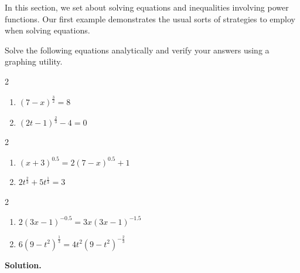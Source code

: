 \documentclass{ximera}
\begin{document}
	\author{Stitz-Zeager}




\setcounter{footnote}{0}

\label{PowerEqIneq}

In this section, we set about solving equations and inequalities involving power functions.  Our first example demonstrates the usual sorts of strategies to employ when solving equations.

\begin{example} \label{powerequationex}  Solve the following equations analytically and verify your answers using a graphing utility.


\begin{multicols}{2}
\begin{enumerate}

\item \label{first} $(7-x)^{\frac{3}{2}} = 8$ 
\item \label{second} $(2t-1)^{\frac{2}{3}} -4 = 0$

\setcounter{HW}{\value{enumi}}
\end{enumerate}
\end{multicols}

\begin{multicols}{2}
\begin{enumerate}
\setcounter{enumi}{\value{HW}}

\item $(x+3)^{0.5} = 2(7-x)^{0.5}+1$ 
\item $2t^{\frac{2}{3}} + 5t^{\frac{1}{3}} = 3$

\setcounter{HW}{\value{enumi}}
\end{enumerate}
\end{multicols}


\begin{multicols}{2}
\begin{enumerate}
\setcounter{enumi}{\value{HW}}

\item $2(3x-1)^{-0.5}  = 3x (3x-1)^{-1.5}$ 
\item $6(9-t^2)^{\frac{1}{3}} = 4t^2 (9-t^2)^{-\frac{2}{3}}$

\setcounter{HW}{\value{enumi}}
\end{enumerate}
\end{multicols}

{\bf Solution.}


\end{example}
\end{document}

